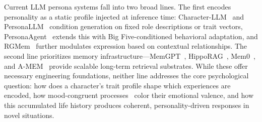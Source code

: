 \documentclass{article}
\begin{document}
Current LLM persona systems fall into two broad lines. The first encodes personality as a static profile injected at inference time: Character-LLM~\cite{shao2023character} and PersonaLLM~\cite{jiang2024personallm} condition generation on fixed role descriptions or trait vectors, PersonaAgent~\cite{zhang2025personaagent} extends this with Big Five-conditioned behavioral adaptation, and RGMem~\cite{tian2025rgmem} further modulates expression based on contextual relationships. The second line prioritizes memory infrastructure—MemGPT~\cite{packer2023memgpt}, HippoRAG~\cite{gutierrez2024hipporag}, Mem0~\cite{chhikara2025mem0}, and A-MEM~\cite{xu2025mem} provide scalable long-term retrieval substrates. While these offer necessary engineering foundations, neither line addresses the core psychological question: how does a character's trait profile shape which experiences are encoded, how mood-congruent processes~\cite{bower1981} color their emotional valence, and how this accumulated life history produces coherent, personality-driven responses in novel situations.
\end{document}
